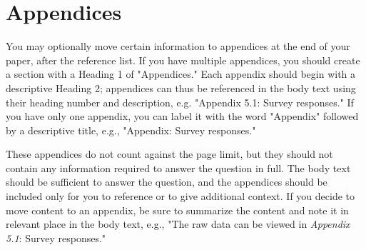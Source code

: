 \documentclass[11pt,a4paper,usenames,dvipsnames]{article}
\begin{document}
\printbibliography
\section{Appendices}
You may optionally move certain information to appendices at the end of your paper, after the reference list. If you have multiple appendices, you should create a section with a Heading 1 of "Appendices." Each appendix should begin with a descriptive Heading 2; appendices can thus be referenced in the body text using their heading number and description, e.g. "Appendix 5.1: Survey responses." If you have only one appendix, you can label it with the word "Appendix" followed by a descriptive title, e.g., "Appendix: Survey responses."

These appendices do not count against the page limit, but they should not contain any information required to answer the question in full. The body text should be sufficient to answer the question, and the appendices should be included only for you to reference or to give additional context. If you decide to move content to an appendix, be sure to summarize the content and note it in relevant place in the body text, e.g., "The raw data can be viewed in \textit{Appendix 5.1}: Survey responses."
\end{document}
